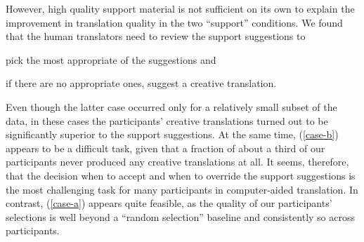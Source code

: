 \documentclass[output=paper]{LSP/langsci}
\begin{document}
However, high quality support material is not sufficient on its own to
explain the improvement in translation quality in the two ``support''
conditions. We found that the human translators need to review the
support suggestions to 
\begin{inparaenum}[(a)]
\item \label{case-a}
  pick the most appropriate of the suggestions and
\item \label{case-b} 
  if there are no appropriate ones, suggest a creative translation.
\end{inparaenum}
Even though the latter case occurred only for a relatively small
subset of the data, in these cases the participants' creative
translations turned out to be significantly superior to the support
suggestions. At the same time, (\ref{case-b}) appears to be a
difficult task, given that a fraction of about a third of our
participants never produced any creative translations at all.
It seems, therefore, that the decision when to accept and when to
override the support suggestions is the most challenging task for many
participants in computer-aided
translation. 
In contrast, (\ref{case-a}) appears quite feasible, as the quality of
our participants' selections is well beyond a ``random selection''
baseline and consistently so across participants.
\end{document}
